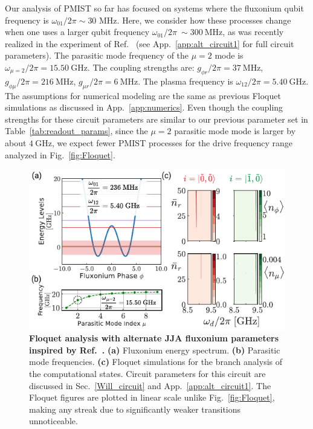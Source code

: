 \documentclass[%
reprint,
superscriptaddress,
 amsmath,amssymb,
 aps,
 prx,
longbibliography,
floatfix,
]{revtex4-2}
\begin{document}
Our analysis of PMIST so far has focused on systems where the fluxonium qubit frequency is $\omega_{01} / 2 \pi \sim 30$ MHz.  
Here, we consider how these processes change when one uses a larger qubit frequency $\omega_{01}/2\pi~\sim 300 \ \mathrm{MHz}$, as was recently realized in the experiment of Ref.~\cite{ding_high-fidelity_2023} (see App.~\ref{app:alt_circuit1} for full circuit parameters). 
The parasitic mode frequency of the $\mu=2$ mode is $\omega_{\mu=2}/2\pi=15.50 \ \mathrm{GHz}$. The coupling strengths are:  $g_{\phi r}/2\pi=37 \ \mathrm{MHz}$, $g_{\phi\mu}/2\pi=216 \ \mathrm{MHz}$, $g_{\mu r}/2\pi=6 \ \mathrm{MHz}$. The plasma frequency is $\omega_{12}/2\pi=5.40 \ \mathrm{GHz}$. %
The assumptions for numerical modeling are the same as previous Floquet simulations as discussed in App.~\ref{app:numerics}. Even though the coupling strengths for these circuit parameters are similar to our previous parameter set in Table~\ref{tab:readout_params}, since the $\mu=2$ parasitic mode mode is larger by about $4 \ \mathrm{GHz}$, we expect fewer PMIST processes for the drive frequency range analyzed in Fig.~\ref{fig:Floquet}. 

\begin{figure}[t]
    \centering
    \includegraphics[width=\linewidth]{Figures/Floquet_Will.pdf}
    \caption{{\bf Floquet analysis with alternate JJA fluxonium parameters inspired by Ref.~\cite{ding_high-fidelity_2023}.} \textbf{(a)} Fluxonium energy spectrum. \textbf{(b)} Parasitic mode frequencies. \textbf{(c)} Floquet simulations for the branch analysis of the computational states. Circuit parameters for this circuit are discussed in Sec.~\ref{Will_circuit} and App.~\ref{app:alt_circuit1}. The Floquet figures are plotted in linear scale unlike Fig.~\ref{fig:Floquet}, making any streak due to significantly weaker transitions unnoticeable.}
    \label{fig:Floquet1}
\end{figure}
\end{document}
